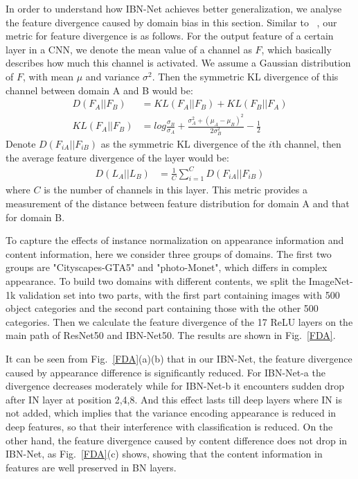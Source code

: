 \documentclass[runningheads]{llncs}
\begin{document}
In order to understand how IBN-Net achieves better generalization, we analyse the feature divergence caused by domain bias in this section.
Similar to ~\cite{li2016revisiting}, our metric for feature divergence is as follows. 
For the output feature of a certain layer in a CNN, we denote the mean value of a channel as \(F\), which basically describes how much this channel is activated.
We assume a Gaussian distribution of \(F\), with mean \(\mu\) and variance \(\sigma^2\).
Then the symmetric KL divergence of this channel between domain A and B would be:
\begin{align}
  D(F_{A} || F_{B}) &= KL(F_{A} || F_{B}) + KL(F_{B} || F_{A}) \\
  KL(F_{A} || F_{B}) &= log\frac{\sigma_{B}}{\sigma_A} + \frac{\sigma_{A}^{2} + (\mu_A - \mu_B)^2}{2\sigma_{B}^{2}} - \frac{1}{2}
\end{align}
Denote \(D(F_{iA}||F_{iB})\) as the symmetric KL divergence of the \(i\)th channel, then the average feature divergence of the layer would be:
\begin{align}
  D(L_{A} || L_{B}) &= \frac{1}{C}\sum_{i=1}^{C}D(F_{iA}||F_{iB})
\end{align}
where \(C\) is the number of channels in this layer. This metric provides a measurement of the distance between feature distribution for domain A and that for domain B.


To capture the effects of instance normalization on appearance information and content information, here we consider three groups of domains.
The first two groups are "Cityscapes-GTA5" and "photo-Monet", which differs in complex appearance.
To build two domains with different contents, we split the ImageNet-1k validation set into two parts, with the first part containing images with 500 object categories and the second part containing those with the other 500 categories.
Then we calculate the feature divergence of the 17 ReLU layers on the main path of ResNet50 and IBN-Net50.
The results are shown in Fig.~\ref{FDA}.

It can be seen from Fig.~\ref{FDA}(a)(b) that in our IBN-Net, the feature divergence caused by appearance difference is significantly reduced.
For IBN-Net-a the divergence decreases moderately while for IBN-Net-b it encounters sudden drop after IN layer at position 2,4,8.
And this effect lasts till deep layers where IN is not added, which implies that the variance encoding appearance is reduced in deep features, so that their interference with classification is reduced.
On the other hand, the feature divergence caused by content difference does not drop in IBN-Net, as Fig.~\ref{FDA}(c) shows,
showing that the content information in features are well preserved in BN layers.
\end{document}
